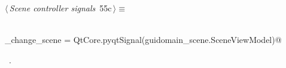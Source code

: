 \documentclass[
    a4paper,      %
    10pt,         %
    openright,    %
    notitlepage,  %
    parskip=half, %
]{scrreprt}       %
\theoremstyle{definition}                    %
\begin{document}
\begin{flushleft} \small
\begin{minipage}{\linewidth}\label{scrap86}\raggedright\small
{} $\langle\,${\itshape Scene controller signals}\nobreak\ {\footnotesize {55c}}$\,\rangle\equiv$
\vspace{-1exm}
\begin{list}{}{} \item
\mbox{}\lstinline@@\\
\mbox{}\lstinline@do_change_scene = QtCore.pyqtSignal(guidomain_scene.SceneViewModel)@\\
\mbox{}\lstinline@@{\NWsep}
\end{list}
\vspace{-1.5ex}
\footnotesize
\begin{list}{}{\setlength{\itemsep}{-\parsep}\setlength{\itemindent}{-\leftmargin}}
\item \NWtxtMacroRefIn\ .

\item{}
\end{list}
\end{minipage}\vspace{4ex}
\end{flushleft}
\end{document}
